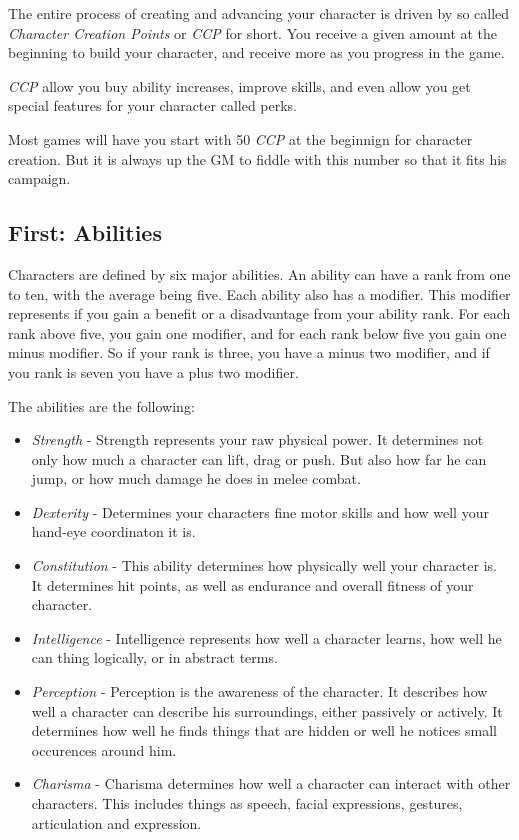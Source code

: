 \documentclass[11pt,a4paper,openany]{scrbook}
\begin{document}
The entire process of creating and advancing your character is driven by so
called \emph{Character Creation Points} or \emph{CCP} for short. You receive
a given amount at the beginning to build your character, and receive more as
you progress in the game.

\emph{CCP} allow you buy ability increases, improve skills, and even allow you
get special features for your character called perks.

Most games will have you start with 50 \emph{CCP} at the beginnign for character
creation. But it is always up the GM to fiddle with this number so that it fits
his campaign.

\subsection{First: Abilities}

Characters are defined by six major abilities. An ability can have a rank from
one to ten, with the average being five. Each ability also has a modifier. This
modifier represents if you gain a benefit or a disadvantage from your ability
rank. For each rank above five, you gain one modifier, and for each rank below
five you gain one minus modifier. So if your rank is three, you have a minus
two modifier, and if you rank is seven you have a plus two modifier.

The abilities are the following:

\begin{itemize}
\item \emph{Strength} - Strength represents your raw physical power. It
  determines not only how much a character can lift, drag or push. But also how
  far he can jump, or how much damage he does in melee combat.
\item \emph{Dexterity} - Determines your characters fine motor skills and how
  well your hand-eye coordinaton it is.
\item \emph{Constitution} - This ability determines how physically well your
  character is. It determines hit points, as well as endurance and overall
  fitness of your character.
\item \emph{Intelligence} - Intelligence represents how well a character learns,
  how well he can thing logically, or in abstract terms.
\item \emph{Perception} - Perception is the awareness of the character. It
  describes how well a character can describe his surroundings, either passively
  or actively. It determines how well he finds things that are hidden or
  well he notices small occurences around him.
\item \emph{Charisma} - Charisma determines how well a character can interact
  with other characters. This includes things as speech, facial expressions,
  gestures, articulation and expression.
\end{itemize}
\end{document}

